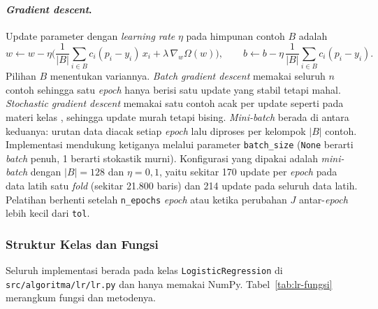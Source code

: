 \paragraph{\textit{Gradient descent}.} Update parameter dengan \textit{learning rate} $\eta$ pada himpunan contoh $B$ adalah
\begin{equation}
	w \leftarrow w - \eta\Big(\frac{1}{|B|}\sum_{i \in B} c_i(p_i - y_i)\,x_i + \lambda\,\nabla_w\Omega(w)\Big), \qquad
	b \leftarrow b - \eta\,\frac{1}{|B|}\sum_{i \in B} c_i(p_i - y_i).
	\label{eq:lr-update}
\end{equation}
Pilihan $B$ menentukan variannya. \textit{Batch gradient descent} memakai seluruh $n$ contoh sehingga satu \textit{epoch} hanya berisi satu update yang stabil tetapi mahal. \textit{Stochastic gradient descent} memakai satu contoh acak per update seperti pada materi kelas \cite{khodra-lr-sga}, sehingga update murah tetapi bising. 
\textit{Mini-batch} berada di antara keduanya: urutan data diacak setiap \textit{epoch} lalu diproses per kelompok $|B|$ contoh. Implementasi mendukung ketiganya melalui parameter \texttt{batch\_size} (\texttt{None} berarti \textit{batch} penuh, 1 berarti stokastik murni). Konfigurasi yang dipakai adalah \textit{mini-batch} dengan $|B| = 128$ dan $\eta = 0{,}1$, yaitu sekitar 170 update per \textit{epoch} pada data latih satu \textit{fold} (sekitar 21.800 baris) dan 214 update pada seluruh data latih. 
Pelatihan berhenti setelah \texttt{n\_epochs} \textit{epoch} atau ketika perubahan $J$ antar-\textit{epoch} lebih kecil dari \texttt{tol}.

\subsubsection{Struktur Kelas dan Fungsi}
Seluruh implementasi berada pada kelas \texttt{LogisticRegression} di \nolinkurl{src/algoritma/lr/lr.py} dan hanya memakai NumPy. Tabel~\ref{tab:lr-fungsi} merangkum fungsi dan metodenya.

